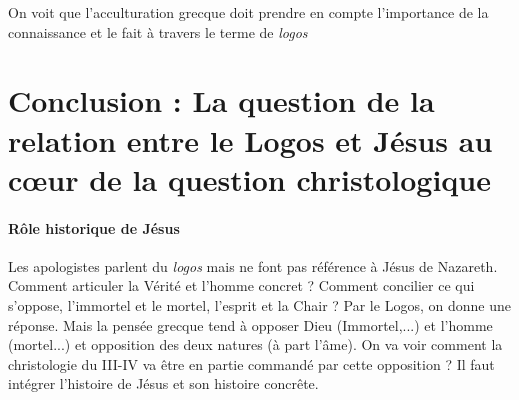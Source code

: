 \begin{Synthesis}
    On voit que l'acculturation grecque doit prendre en compte l'importance de la connaissance et le fait à travers le terme de \textit{logos}
\end{Synthesis}




\hypertarget{conclusion-la-question-de-la-relation-entre-le-logos-et-juxe9sus-au-cux153ur-de-la-question-christologique}{%
\section{Conclusion : La question de la relation entre le Logos et
Jésus au cœur de la question
christologique}\label{conclusion-la-question-de-la-relation-entre-le-logos-et-juxe9sus-au-cux153ur-de-la-question-christologique}}


\paragraph{Rôle historique de Jésus} Les apologistes parlent du \textit{logos} mais ne font pas référence à Jésus de Nazareth. Comment articuler la Vérité et l'homme concret ? Comment concilier ce qui s'oppose, l'immortel et le mortel, l'esprit et la Chair ? Par le Logos, on donne une réponse. 
Mais la pensée grecque tend à opposer Dieu (Immortel,...) et l'homme (mortel...) et opposition des deux natures (à part l'âme). On va voir comment la christologie du III-IV va être en partie commandé par cette opposition ?
Il faut intégrer l'histoire de Jésus et son histoire concrête. 

 








